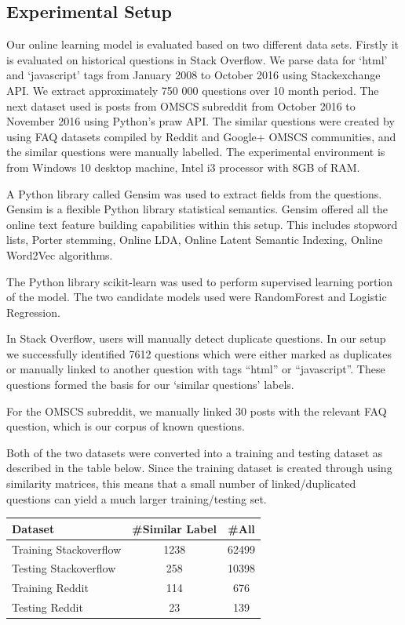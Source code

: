 \documentclass[journal]{IEEEtran}
\begin{document}
\subsection{Experimental Setup}

Our online learning model is evaluated based on two different data sets. Firstly it is evaluated on historical questions in Stack Overflow. We parse data for `html' and `javascript' tags from January 2008 to October 2016 using Stackexchange API. We extract approximately 750 000 questions over 10 month period. The next dataset used is posts from OMSCS subreddit from October 2016 to November 2016 using Python's praw API. The similar questions were created by using FAQ datasets compiled by Reddit and Google+ OMSCS communities, and the similar questions were manually labelled. The experimental environment is from Windows 10 desktop machine, Intel i3 processor with 8GB of RAM. 

A Python library called Gensim was used to extract fields from the questions. Gensim is a flexible Python library statistical semantics. Gensim offered all the online text feature building capabilities within this setup. This includes stopword lists, Porter stemming, Online LDA, Online Latent Semantic Indexing, Online Word2Vec algorithms.

The Python library scikit-learn was used to perform supervised learning portion of the model. The two candidate models used were RandomForest and Logistic Regression. 

In Stack Overflow, users will manually detect duplicate questions. In our setup we successfully identified 7612 questions which were either marked as duplicates or manually linked to another question with tags ``html'' or ``javascript''. These questions formed the basis for our `similar questions' labels. 

For the OMSCS subreddit, we manually linked 30 posts with the relevant FAQ question, which is our corpus of known questions. 

Both of the two datasets were converted into a training and testing dataset as described in the table below. Since the training dataset is created through using similarity matrices, this means that a small number of linked/duplicated questions can yield a much larger training/testing set. 

\begin{center}
 \begin{tabular}{|l c c |} 
 \hline
 Dataset & \#Similar Label & \#All \\ [0.5ex] 
 \hline\hline
 Training Stackoverflow & 1238 & 62499 \\ 
 \hline
 Testing Stackoverflow & 258 & 10398  \\
 \hline
 Training Reddit & 114 &   676 \\
 \hline
 Testing Reddit & 23 & 139  \\
 \hline
\end{tabular}
\end{center}
\end{document}
